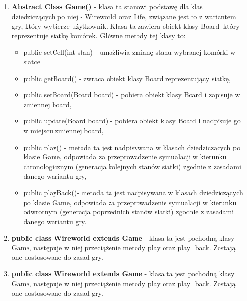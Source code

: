 \documentclass[10pt, oneside]{article}
\begin{document}
\begin{enumerate}
\item \textbf{Abstract Class Game()} - klasa ta stanowi podstawę dla klas dziedziczących po niej - Wireworld oraz Life, związane jest to z wariantem gry, który wybierze użytkownik. 
					Klasa ta zawiera obiekt klasy Board, który reprezentuje siatkę komórek.
					Główne metody tej klasy to:
	\begin{itemize}
	\item public  setCell(int stan) - umożliwia zmianę stanu wybranej komórki w siatce
	\item public getBoard() - zwraca obiekt klasy Board reprezentujący siatkę,
	\item public  setBoard(Board board) - pobiera obiekt klasy Board i zapisuje w zmiennej board,
	\item public update(Board board) - pobiera obiekt klasy Board i nadpisuje go w miejscu zmiennej board,
	\item public play() - metoda ta jest nadpisywana w klasach dziedziczących po klasie Game, odpowiada za przeprowadzenie symualacji w kierunku chronologicznym (generacja kolejnych stanów siatki) zgodnie z zasadami danego wariantu gry,
	\item public playBack()- metoda ta jest nadpisywana w klasach dziedziczących po klasie Game, odpowiada za przeprowadzenie symualacji w kierunku odwrotnym (generacja poprzednich stanów siatki) zgodnie z zasadami danego wariantu gry.
 
	\end{itemize}
	

\item   \textbf{public class Wireworld extends Game} - klasa ta jest pochodną klasy Game, następuje w niej przeciążenie metody play oraz play\_back. Zostają one dostosowane do zasad gry. 
\item  \textbf{ public class Wireworld extends Game} - klasa ta jest pochodną klasy Game, następuje w niej przeciążenie metody play oraz play\_back. Zostają one dostosowane do zasad gry. 
\end{enumerate}
\end{document}
